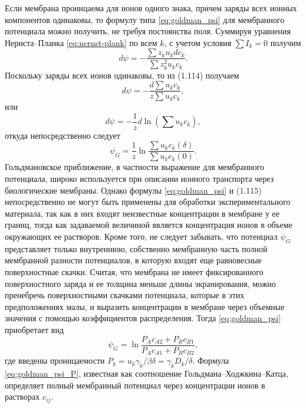 Если мембрана проницаема для ионов одного знака, причем заряды всех ионных
компонентов одинаковы, то формулу типа \eqref{eq:goldman_psi} для мембранного
потенциала можно получить, не требуя постоянства поля. Суммируя уравнения
Нернста--Планка \eqref{eq:nernst-plank} по всем \( k \), с учетом условия
\( \sum I_k= 0 \) получим
\begin{equation}
    d\psi = -\frac{\sum z_k u_k dc_k}{\sum z_k^2 u_k c_k}.
\end{equation}
Поскольку заряды всех ионов одинаковы, то из (1.114) получаем
\[
    d\psi = -\frac{d\sum u_k c_k}{z \sum u_k c_k},
\]
или
\[
    d\psi = -\frac{1}{z}d\ln\left(\sum u_k c_k\right),
\]
откуда непосредственно следует
\begin{equation}
    \psi_G =\frac{1}{z}\ln\frac{\sum u_k c_k(\delta)}{\sum u_k c_k(0)}.
\end{equation}
Гольдмановское приближение, в частности выражение для мембранного потенциала,
широко используется при описании ионного транспорта через биологические
мембраны. Однако формулы \eqref{eq:goldman_psi} и (1.115) непосредственно не
могут быть применены для обработки экспериментального материала, так как в них
входят неизвестные концентрации в мембране у ее границ, тогда как задаваемой
величиной является концентрация ионов в объеме окружающих ее растворов. Кроме
того, не следует забывать, что потенциал \( \psi_G \) представляет только
внутреннюю, собственно мембранную часть полной мембранной разности потенциалов,
в которую входят еще равновесные поверхностные скачки. Считая, что мембрана не
имеет фиксированного поверхностного заряда и ее толщина меньше длины
экранирования, можно пренебречь поверхностными скачками потенциала, которые в
этих предположениях малы, и выразить концентрации в мембране через объемные
значения с помощью коэффициентов распределения. Тогда \eqref{eq:goldman_psi}
приобретает вид
\begin{equation}
    \psi_G =
    \ln\frac{P_A c_{A2} + P_B c_{B1}}{P_A c_{A1} + P_B c_{B2}},
    \label{eq:goldman_psi_P}
\end{equation}
где введены проницаемости
\( P_k = u_k\gamma_k/\beta\delta = \gamma_k D_k / \delta \). Формула
\eqref{eq:goldman_psi_P}, известная как соотношение Гольдмана--Ходжкина--Катца,
определяет полный мембранный потенциал через концентрации ионов в растворах
\( c_{ij} \).

